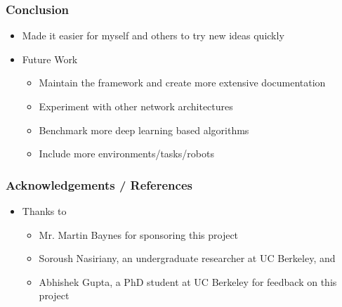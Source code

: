 \documentclass[handout]{beamer}
\begin{document}
    \begin{frame}
        \frametitle{Conclusion}
        \begin{itemize}
            \item{Made it easier for myself and others to try new ideas quickly}
            \item{Future Work}
            \begin{itemize}
                \item{Maintain the framework and create more extensive documentation}
                \item{Experiment with other network architectures}
                \item{Benchmark more deep learning based algorithms}
                \item{Include more environments/tasks/robots}
            \end{itemize}
        \end{itemize}
    \end{frame}
    \begin{frame}
        \frametitle{Acknowledgements / References}
        \begin{itemize}
            \item{Thanks to}
            \begin{itemize}
                \item{Mr. Martin Baynes for sponsoring this project}
                \item{Soroush Nasiriany, an undergraduate researcher at UC Berkeley, and}
                \item{Abhishek Gupta, a PhD student at UC Berkeley for feedback on this project}
            \end{itemize}
        \end{itemize}
    \end{frame}
    
\end{document}
